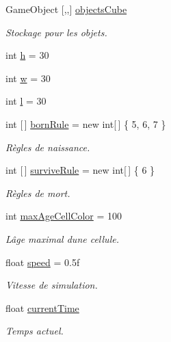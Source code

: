 \begin{DoxyCompactItemize}
Game\+Object \mbox{[},,\mbox{]} \mbox{\hyperlink{class_simulation_a50ea19ab370b70d5cbb7e0d22510c542}{objects\+Cube}}
\begin{DoxyCompactList}\small\item\em Stockage pour les objets. \end{DoxyCompactList}\item 
int \mbox{\hyperlink{class_simulation_a66b52a85390c56f61bdd9f8dcf112608}{h}} = 30
\item 
int \mbox{\hyperlink{class_simulation_ae5fbb318a6156864c54a36380ff54a23}{w}} = 30
\item 
int \mbox{\hyperlink{class_simulation_ae57d3ef4739c9bfee92f26318c848b61}{l}} = 30
\item 
int \mbox{[}$\,$\mbox{]} \mbox{\hyperlink{class_simulation_a6669b07eee108268664786cefe871ecc}{born\+Rule}} = new int\mbox{[}$\,$\mbox{]} \{ 5, 6, 7 \}
\begin{DoxyCompactList}\small\item\em Règles de naissance. \end{DoxyCompactList}\item 
int \mbox{[}$\,$\mbox{]} \mbox{\hyperlink{class_simulation_afd9ae047431cdaa8de58cd9a442dcf18}{survive\+Rule}} = new int\mbox{[}$\,$\mbox{]} \{ 6 \}
\begin{DoxyCompactList}\small\item\em Règles de mort. \end{DoxyCompactList}\item 
int \mbox{\hyperlink{class_simulation_ad7b1f3e5fcdb993f152bc37f952c08d6}{max\+Age\+Cell\+Color}} = 100
\begin{DoxyCompactList}\small\item\em L\textquotesingle{}âge maximal d\textquotesingle{}une cellule. \end{DoxyCompactList}\item 
float \mbox{\hyperlink{class_simulation_a4e347114640730fa13c37ef9aa295d5c}{speed}} = 0.\+5f
\begin{DoxyCompactList}\small\item\em Vitesse de simulation. \end{DoxyCompactList}\item 
float \mbox{\hyperlink{class_simulation_a69eb0a203edb869b0e80d9a86bee80e8}{current\+Time}}
\begin{DoxyCompactList}\small\item\em Temps actuel. \end{DoxyCompactList}\item 

\end{DoxyCompactItemize}
